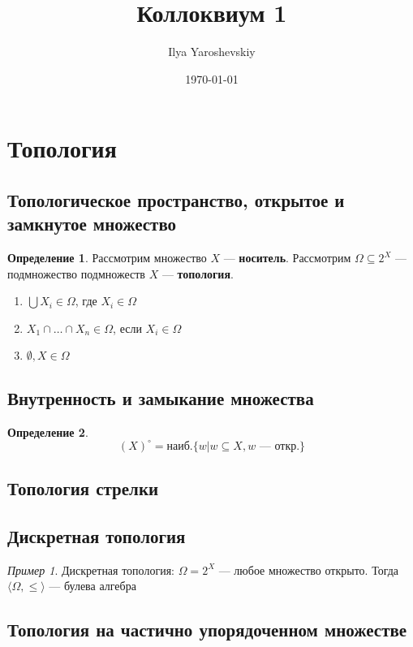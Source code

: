 \documentclass[english]{article}
\author{Ilya Yaroshevskiy}
\date{\today}
\title{Коллоквиум 1}
\theoremstyle{plain}
\theoremstyle{remark}
\newtheorem*{examp}{Пример}
\theoremstyle{definition}
\newtheorem*{definition}{Определение}
\begin{document}
\maketitle
\tableofcontents


\section{Топология}
\label{sec:org4ed8669}
\subsection{Топологическое пространство, открытое и замкнутое множество}
\label{sec:org1c64fca}
\begin{definition}
Рассмотрим множество \(X\) --- \textbf{носитель}. Рассмотрим \(\Omega \subseteq 2^X\) --- подмножество подмножеств \(X\) --- \textbf{топология}.
\begin{enumerate}
\item \(\bigcup X_i \in \Omega\), где \(X_i \in \Omega\)
\item \(X_1 \cap \dots \cap X_n \in \Omega\), если \(X_i \in \Omega\)
\item \(\emptyset, X \in \Omega\)
\end{enumerate}
\label{orgcb373af}
\end{definition}
\subsection{Внутренность и замыкание множества}
\label{sec:org3c09277}
\begin{definition}
\[ (X)^\circ = \text{наиб.}\{w \big| w \subseteq X, w\text{ --- откр.}\}\]
\label{org6cd2dbb}
\end{definition}
\subsection{Топология стрелки}
\label{sec:orgd4f34ac}
\subsection{Дискретная топология}
\label{sec:orgef72232}
\begin{examp}
Дискретная топология: \(\Omega = 2^X\) --- любое множество открыто. Тогда \(\langle \Omega, \le \rangle\) --- булева алгебра
\label{org497217b}
\end{examp}
\subsection{Топология на частично упорядоченном множестве}
\label{sec:orgec1bd7d}
\end{document}
